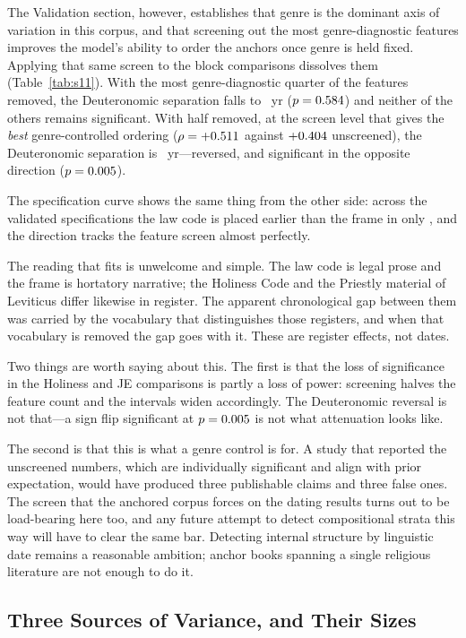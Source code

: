 \documentclass[10pt,letterpaper]{article}
\begin{document}
The Validation section, however, establishes that genre is the dominant axis of
variation in this corpus, and that screening out the most genre-diagnostic
features improves the model's ability to order the anchors once genre is held
fixed.  Applying that same screen to the block comparisons dissolves them
(Table~\ref{tab:s11}).  With the most genre-diagnostic quarter of the features
removed, the Deuteronomic separation falls to \BRQDCodegap~yr ($p =
0.584$) and neither of the others remains significant.  With half removed,
at the screen level that gives the \emph{best} genre-controlled ordering
($\rho = +0.511$ against $+0.404$ unscreened), the Deuteronomic
separation is \BRHDCodegap~yr---reversed, and significant in the opposite
direction ($p = 0.005$).

The specification curve shows the same thing from the other side: across the
\SPcodeN{} validated specifications the law code is placed earlier than the
frame in only \SPcodeEarlier, and the direction tracks the feature screen
almost perfectly.

The reading that fits is unwelcome and simple.  The law code is legal prose and
the frame is hortatory narrative; the Holiness Code and the Priestly material of
Leviticus differ likewise in register.  The apparent chronological gap between
them was carried by the vocabulary that distinguishes those registers, and when
that vocabulary is removed the gap goes with it.  These are register effects,
not dates.

Two things are worth saying about this.  The first is that the loss of
significance in the Holiness and JE comparisons is partly a loss of power:
screening halves the feature count and the intervals widen accordingly.  The
Deuteronomic reversal is not that---a sign flip significant at $p =
0.005$ is not what attenuation looks like.

The second is that this is what a genre control is for.  A study that reported
the unscreened numbers, which are individually significant and align with prior
expectation, would have produced three publishable claims and three false ones.
The screen that the anchored corpus forces on the dating results turns out to be
load-bearing here too, and any future attempt to detect compositional strata
this way will have to clear the same bar.  Detecting internal structure by
linguistic date remains a reasonable ambition; \HBbooks{} anchor books spanning
a single religious literature are not enough to do it.

\subsection*{Three Sources of Variance, and Their Sizes}
\end{document}
